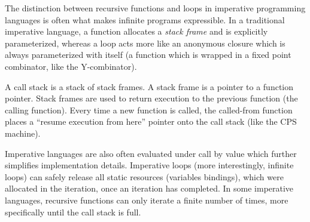The distinction between recursive functions and loops in imperative programming languages is often what makes infinite programs expressible.
In a traditional imperative language, a function allocates a \textit{stack frame} and is explicitly parameterized, whereas a loop acts more like an anonymous closure which is always parameterized with itself (a function which is wrapped in a fixed point combinator, like the Y-combinator).
\begin{remark}
	A call stack is a stack of stack frames.
	A stack frame is a pointer to a function pointer.
	Stack frames are used to return execution to the previous function (the calling function).
  Every time a new function is called, the called-from function places a ``resume execution from here'' pointer onto the call stack (like the CPS machine).
\end{remark}
\noindent Imperative languages are also often evaluated under call by value which further simplifies implementation details.
Imperative loops (more interestingly, infinite loops) can safely release all static resources (variables bindings), which were allocated in the iteration, once an iteration has completed.
In some imperative languages, recursive functions can only iterate a finite number of times, more specifically until the call stack is full.



